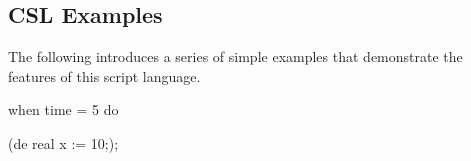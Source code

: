 \documentclass{crescendorepchap}
\begin{document}










\subsection{CSL Examples}

The following introduces a series of simple examples that demonstrate
the features of this script language.

\begin{dcl}
when time = 5 do

(de real x := 10;);
\end{dcl}
\end{document}

